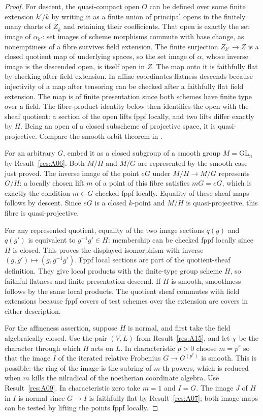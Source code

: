 \documentclass[11pt,a4paper,openany,oneside]{book}
\theoremstyle{resultstyle}
\theoremstyle{definition}
\numberwithin{equation}{chapter}
\newcommand{\GL}{\mathrm{GL}}
\begin{document}
\begin{proof}
For descent, the quasi-compact open \(O\) can be defined over some
finite extension \(k'/k\) by writing it as a finite union of
principal opens in the finitely many charts of \(Z_{\bar k}\) and
retaining their coefficients. That open is exactly the set image
of \(\alpha_{k'}\): set images of scheme morphisms commute with
base change, as nonemptiness of a fibre survives field extension.
The finite surjection \(Z_{k'}\to Z\) is a closed quotient map of
underlying spaces, so the set image of \(\alpha\), whose inverse
image is the descended open, is itself open in \(Z\). The map onto
it is faithfully flat by checking after field extension. In affine
coordinates flatness descends because injectivity of a map after
tensoring can be checked after a faithfully flat field extension.
The map is of finite presentation since both schemes have finite
type over a field. The fibre-product identity below then
identifies the open with the sheaf quotient: a section of the open
lifts fppf locally, and two lifts differ exactly by \(H\).
Being an open of a closed subscheme of projective space, it is
quasi-projective. Compare the smooth orbit theorem in
\cite[Proposition 7.17 and Theorem 7.18]{milne}.

For an arbitrary \(G\), embed it as a closed subgroup of a
smooth group \(M=\GL_n\) by Result~\ref{res:A06}. Both \(M/H\)
and \(M/G\) are represented by the smooth case just proved.
The inverse image of the point \(eG\) under \(M/H\to M/G\)
represents \(G/H\): a locally chosen lift \(m\) of a point
of this fibre satisfies \(mG=eG\), which is exactly the condition
\(m\in G\) checked fppf locally. Equality of these sheaf maps
follows by descent. Since \(eG\) is a closed \(k\)-point and
\(M/H\) is quasi-projective, this fibre is quasi-projective.

For any represented quotient, equality of the two image
sections \(q(g)\) and \(q(g')\) is equivalent to
\(g^{-1}g'\in H\): membership can be checked fppf locally
since \(H\) is closed. This proves the displayed isomorphism
with inverse \((g,g')\mapsto(g,g^{-1}g')\).
Fppf local sections are part of the quotient-sheaf definition.
They give local products with the finite-type group scheme \(H\),
so faithful flatness and finite presentation descend. If \(H\)
is smooth, smoothness follows by the same local products.
The quotient sheaf commutes with field extensions because fppf
covers of test schemes over the extension are covers in either
description.

For the affineness assertion, suppose \(H\) is normal, and
first take the field algebraically closed. Use the pair
\((V,L)\) from Result~\ref{res:A15}, and let \(\chi\) be
the character through which \(H\) acts on \(L\). In characteristic
\(p>0\) choose \(m=p^r\) so that the image \(I\) of the iterated
relative Frobenius \(G\to G^{(p^r)}\) is smooth. This is possible:
the ring of the image is the subring of \(m\)-th powers, which is
reduced when \(m\) kills the nilradical of the noetherian
coordinate algebra. Use Result~\ref{res:A09}. In characteristic
zero take \(m=1\) and \(I=G\).
The image \(J\) of \(H\) in \(I\) is normal since \(G\to I\)
is faithfully flat by Result~\ref{res:A07}; both image
maps can be tested by lifting the points fppf locally.


\end{proof}
\end{document}
